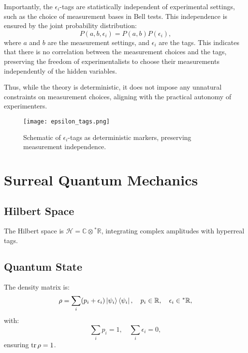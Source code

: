 \documentclass{article}
\begin{document}
Importantly, the \(\epsilon_i\)-tags are statistically independent of experimental settings, such as the choice of measurement bases in Bell tests. This independence is ensured by the joint probability distribution:
\begin{equation}
P(a, b, \epsilon_i) = P(a, b) P(\epsilon_i),
\end{equation}
where \(a\) and \(b\) are the measurement settings, and \(\epsilon_i\) are the tags. This indicates that there is no correlation between the measurement choices and the tags, preserving the freedom of experimentalists to choose their measurements independently of the hidden variables.

Thus, while the theory is deterministic, it does not impose any unnatural constraints on measurement choices, aligning with the practical autonomy of experimenters.

\begin{figure}[h]
    \centering
    \texttt{[image: epsilon\_tags.png]}
    \caption{Schematic of \(\epsilon_i\)-tags as deterministic markers, preserving measurement independence.}
    \label{fig:epsilon_tags}
\end{figure}

\section{Surreal Quantum Mechanics}
\subsection{Hilbert Space}
The Hilbert space is \(\mathcal{H} = \mathbb{C} \otimes {}^*\mathbb{R}\), integrating complex amplitudes with hyperreal tags.

\subsection{Quantum State}
The density matrix is:
\begin{equation}
\rho = \sum_i (p_i + \epsilon_i) \ket{\psi_i}\bra{\psi_i}, \quad p_i \in \mathbb{R}, \quad \epsilon_i \in {}^*\mathbb{R},
\end{equation}
with:
\begin{equation}
\sum_i p_i = 1, \quad \sum_i \epsilon_i = 0,
\end{equation}
ensuring \(\tr \rho = 1\).
\end{document}
